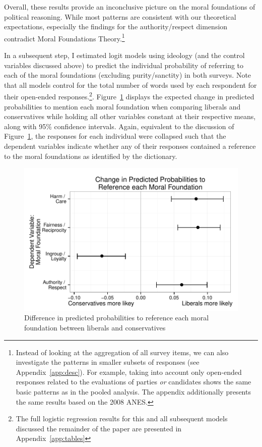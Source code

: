 \documentclass[12pt]{article}
\begin{document}
Overall, these results provide an inconclusive picture on the moral foundations of political reasoning. While most patterns are consistent with our theoretical expectations, especially the findings for the authority/respect dimension contradict Moral Foundations Theory.\footnote{Instead of looking at the aggregation of all survey items, we can also investigate the patterns in smaller subsets of responses (see Appendix~\ref{app:desc}). For example, taking into account only open-ended responses related to the evaluations of parties \textit{or} candidates shows the same basic patterns as in the pooled analysis. The appendix additionally presents the same results based on the 2008 ANES.}

In a subsequent step, I estimated logit models using ideology (and the control variables discussed above) to predict the individual probability of referring to each of the moral foundations (excluding purity/sanctity) in both surveys. Note that all models control for the total number of words used by each respondent for their open-ended responses.\footnote{The full logistic regression results for this and all subsequent models discussed the remainder of the paper are presented in Appendix~\ref{app:tables}}. Figure~\ref{fig:2ideol} displays the expected change in predicted probabilities to mention each moral foundation when comparing liberals and conservatives while holding all other variables constant at their respective means, along with 95\% confidence intervals. Again, equivalent to the discussion of Figure~\ref{fig:2ideol}, the responses for each individual were collapsed such that the dependent variables indicate whether any of their responses contained a reference to the moral foundations as identified by the dictionary. 

\begin{figure}[h]\centering
\includegraphics[scale=.9]{../calc/fig/fig2ideol.pdf}
\caption{Difference in predicted probabilities to reference each moral foundation between liberals and conservatives}\label{fig:2ideol}
\end{figure}
\end{document}
